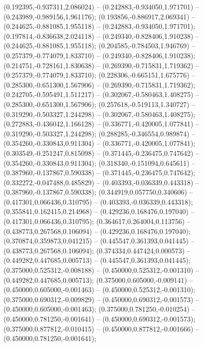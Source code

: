  (0.192395,-0.937311,2.086024) -- (0.242883,-0.934050,1.971701) -- (0.243989,-0.989156,1.961176);
 (0.193856,-0.886917,2.069341) -- (0.244625,-0.881085,1.955118) -- (0.242883,-0.934050,1.971701);
 (0.197814,-0.836638,2.024118) -- (0.249340,-0.828406,1.910238) -- (0.244625,-0.881085,1.955118);
 (0.204585,-0.784503,1.946769) -- (0.257379,-0.774079,1.833710) -- (0.249340,-0.828406,1.910238);
 (0.214751,-0.728161,1.830638) -- (0.269390,-0.715831,1.719362) -- (0.257379,-0.774079,1.833710);
 (0.228306,-0.665151,1.675776) -- (0.285300,-0.651300,1.567906) -- (0.269390,-0.715831,1.719362);
 (0.242705,-0.595491,1.511217) -- (0.302067,-0.580463,1.408275) -- (0.285300,-0.651300,1.567906);
 (0.257618,-0.519113,1.340727) -- (0.319290,-0.503327,1.244298) -- (0.302067,-0.580463,1.408275);
 (0.272883,-0.436042,1.166128) -- (0.336771,-0.420005,1.077841) -- (0.319290,-0.503327,1.244298);
 (0.288285,-0.346554,0.989874) -- (0.354260,-0.330843,0.911304) -- (0.336771,-0.420005,1.077841);
 (0.303549,-0.251247,0.815098) -- (0.371445,-0.236475,0.747642) -- (0.354260,-0.330843,0.911304);
 (0.318340,-0.151094,0.645611) -- (0.387960,-0.137867,0.590338) -- (0.371445,-0.236475,0.747642);
 (0.332272,-0.047488,0.485829) -- (0.403393,-0.036339,0.443318) -- (0.387960,-0.137867,0.590338);
 (0.344919,0.057750,0.340606) -- (0.417301,0.066436,0.310795) -- (0.403393,-0.036339,0.443318);
 (0.355841,0.162415,0.214968) -- (0.429236,0.168476,0.197040) -- (0.417301,0.066436,0.310795);
 (0.364617,0.264004,0.113756) -- (0.438773,0.267568,0.106094) -- (0.429236,0.168476,0.197040);
 (0.370874,0.359873,0.041215) -- (0.445547,0.361393,0.041445) -- (0.438773,0.267568,0.106094);
 (0.374334,0.447424,0.000573) -- (0.449282,0.447685,0.005713) -- (0.445547,0.361393,0.041445);
 (0.375000,0.525312,-0.008188) -- (0.450000,0.525312,-0.001310) -- (0.449282,0.447685,0.005713);
 (0.375000,0.605000,-0.009141) -- (0.450000,0.605000,-0.001463) -- (0.450000,0.525312,-0.001310);
 (0.375000,0.690312,-0.009829) -- (0.450000,0.690312,-0.001573) -- (0.450000,0.605000,-0.001463);
 (0.375000,0.781250,-0.010254) -- (0.450000,0.781250,-0.001641) -- (0.450000,0.690312,-0.001573);
 (0.375000,0.877812,-0.010415) -- (0.450000,0.877812,-0.001666) -- (0.450000,0.781250,-0.001641);

